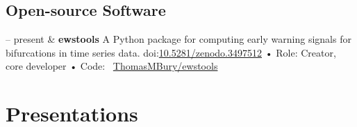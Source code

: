\documentclass[11pt, a4paper]{article}
\newcommand{\DOI}[1]{doi:\href{https://doi.org/#1}{#1}}
\newcommand{\GitHub}[1]{\newline • Code: \faGithub\ \href{https://github.com/#1}{#1}}
\newcommand{\Role}[1]{\newline • Role: #1}
\newcommand{\Website}[1]{\newline • Website: \href{https://#1}{#1}}
\newcommand{\Duration}[2]{\fontsize{10pt}{0}\selectfont #1 -- #2}
\newcommand{\Ongoing}{present}
\begin{document}
\subsection{Open-source Software}

\begin{EntriesTable}
  \Duration{2019}{\Ongoing} &
  \textbf{ewstools}
  \newline
  A Python package for computing early warning signals for bifurcations in time series data.
  \DOI{10.5281/zenodo.3497512}
  \Role{Creator, core developer}
  \GitHub{ThomasMBury/ewstools}
\end{EntriesTable}



\section{Presentations}
\end{document}
